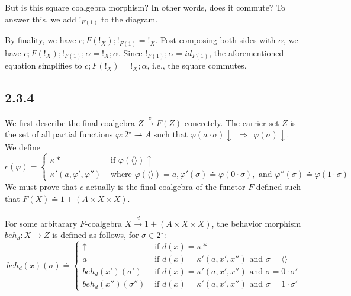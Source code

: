 \documentclass{article}
\begin{document}
But is this square coalgebra morphism? In other words, does it commute? To answer this, we add $!_{F(1)}$ to the diagram.

\begin{center}
\end{center}

By finality, we have $c;F(!_X);!_{F(1)} = !_X$. Post-composing both sides with $\alpha$, we have 
$c;F(!_X);!_{F(1)};\alpha = !_X;\alpha$. Since $!_{F(1)};\alpha = id_{F(1)}$, the aforementioned equation
simplifies to $c;F(!_X) = !_X;\alpha$, i.e., the square commutes.

\subsection*{2.3.4}

We first describe the final coalgebra $Z \overset{c}{\to} F(Z)$ concretely. 
The carrier set $Z$ is the set of all partial functions 
$\varphi : 2^{\star} \rightharpoonup A$ such that $\varphi(a \cdot \sigma) \downarrow~~\Rightarrow~~\varphi(\sigma) \downarrow$.
We define 
$$c(\varphi) = \left \{ \begin{array}{ll} \kappa \ast & \text{ if } \varphi(\langle \rangle) \uparrow \\ \kappa'(a,\varphi',\varphi'') & \text{ where } \varphi(\langle \rangle) = a, \varphi'(\sigma) \doteq \varphi(0 \cdot \sigma), \text{ and } \varphi''(\sigma) \doteq \varphi(1 \cdot \sigma) \end{array} \right .$$
We must prove that $c$ actually is the final coalgebra of the functor $F$ defined such that $F(X) \doteq 1 + (A \times X \times X)$.\\~\\
For some arbitarary $F$-coalgebra $X \overset{d}{\longrightarrow} 1 + (A \times X \times X)$, the behavior
morphism $\mathit{beh_d} : X \to Z$ is defined as follows, for $\sigma \in 2^\star$:
$$ \mathit{beh_d}(x)(\sigma) \doteq 
  \left \{ \begin{array}{ll} 
    \uparrow & \text{ if } d(x) = \kappa \ast \\
    a & \text{ if } d(x) = \kappa'(a,x',x'') \text{ and } \sigma = \langle \rangle \\
    \mathit{beh_d}(x')(\sigma') & \text{ if } d(x) = \kappa'(a,x',x'') \text{ and } \sigma = 0 \cdot \sigma' \\
    \mathit{beh_d}(x'')(\sigma'') & \text{ if } d(x) = \kappa'(a,x',x'') \text{ and } \sigma = 1 \cdot \sigma' 
  \end{array} \right . $$
\end{document}
